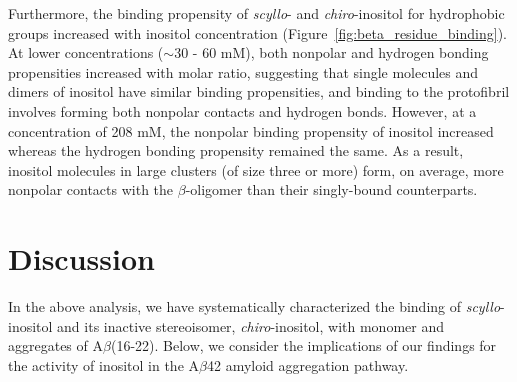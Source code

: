 Furthermore, the binding propensity of \emph{scyllo}- and \emph{chiro}-inositol for hydrophobic groups increased with inositol concentration (Figure~\ref{fig:beta_residue_binding}).  At lower concentrations ($\sim$30 - 60 mM), both nonpolar and hydrogen bonding propensities increased with molar ratio, suggesting that single molecules and dimers of inositol have similar binding propensities, and binding to the protofibril involves forming both nonpolar contacts and hydrogen bonds.  However, at a concentration of 208 mM, the nonpolar binding propensity of inositol increased whereas the hydrogen bonding propensity remained the same.  As a result, inositol molecules in large clusters (of size three or more) form, on average, more nonpolar contacts with the $\beta$-oligomer than their singly-bound counterparts.




\section{Discussion}
In the above analysis, we have systematically characterized the binding of \emph{scyllo}-inositol and its inactive stereoisomer, \emph{chiro}-inositol, with monomer and aggregates of A$\beta$(16-22). Below, we consider the implications of our findings for the activity of inositol in the A$\beta$42 amyloid aggregation pathway.

